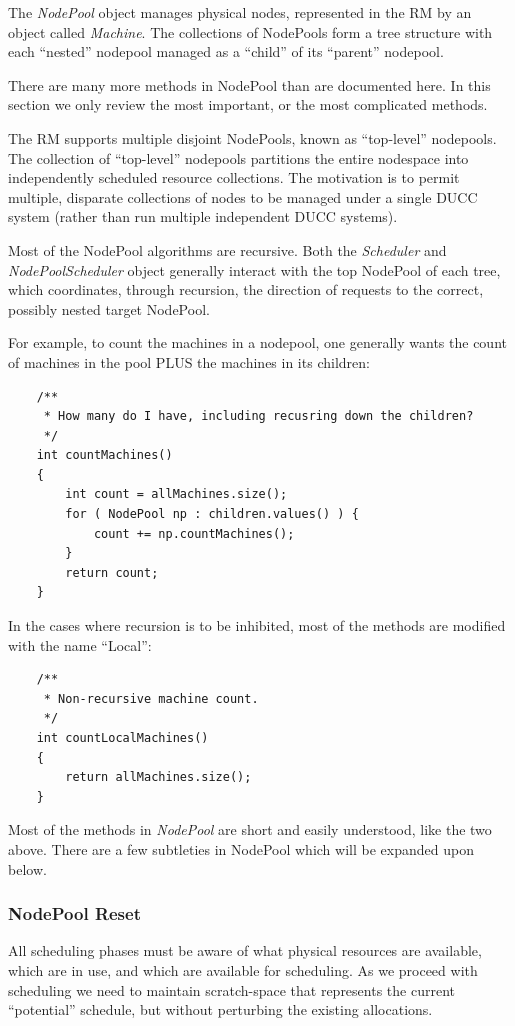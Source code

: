     The {\em NodePool} object manages physical nodes, represented in the RM by an
    object called {\em Machine}.  The collections of NodePools form a tree structure
    with each ``nested'' nodepool managed as a ``child'' of its ``parent'' nodepool.
    
    There are many more methods in NodePool than are documented here.  In this section
    we only review the most important, or the most complicated methods.

    The RM supports multiple disjoint NodePools, known as ``top-level'' nodepools.  The collection
    of ``top-level'' nodepools partitions the entire nodespace into independently scheduled
    resource collections.  The motivation is to permit multiple, disparate collections of nodes to
    be managed under a single DUCC system (rather than run multiple independent DUCC systems).

    Most of the NodePool algorithms are recursive.  Both the {\em Scheduler} and
    {\em NodePoolScheduler} object generally interact with the top NodePool of each
    tree, which coordinates, through recursion, the direction of requests to the 
    correct, possibly nested target NodePool.

    For example, to count the machines in a nodepool, one generally wants the count of
    machines in the pool PLUS the machines in its children:
\begin{verbatim}
    /**
     * How many do I have, including recusring down the children?
     */
    int countMachines()
    {
        int count = allMachines.size();
        for ( NodePool np : children.values() ) {
            count += np.countMachines();
        }
        return count;
    }
\end{verbatim}

    In the cases where recursion is to be inhibited, most of the methods are modified
    with the name ``Local'':
\begin{verbatim}
    /**
     * Non-recursive machine count.
     */
    int countLocalMachines()
    {
        return allMachines.size();
    }
\end{verbatim}

    Most of the methods in {\em NodePool} are short and easily understood, like the two above. There
    are a few subtleties in NodePool which will be expanded upon below.

\subsubsection{NodePool Reset}
    All scheduling phases must be aware of what physical resources are available, which are in use, and
    which are available for scheduling.  As we proceed with scheduling we need to maintain scratch-space
    that represents the current ``potential'' schedule, but without perturbing the existing allocations.
    
